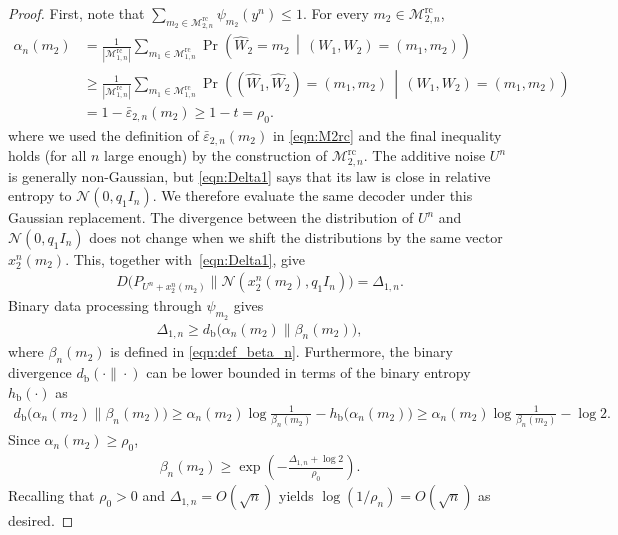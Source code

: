 \documentclass[11pt,onecolumn]{IEEEtran}
\newcommand{\calM}{\mathcal{M}}
\newcommand{\calN}{\mathcal{N}}
\newcommand{\rmb}{\mathrm{b}}
\newcommand{\bbE}{\mathbb{E}}
\newcommand{\eps}{\varepsilon}
\newcommand{\rc}{\mathrm{rc}}
\begin{document}
\begin{proof}
First, note that $\sum_{m_2 \in \calM_{2,n}^\rc}\psi_{m_2}(y^n)\le 1$.  For every $m_2\in\calM_{2,n}^\rc$, 
\begin{align}
\alpha_n(m_2)
&=\frac{1}{|\calM_{1,n}^{\rc}|}
  \sum_{m_1\in\calM_{1,n}^{\rc}}
  \Pr\!\left(
       \hat W_2=m_2
       \,\middle|\,
       (W_1,W_2)=(m_1,m_2)
       \right) \nonumber\\
&\ge
  \frac{1}{|\calM_{1,n}^{\rc}|}
  \sum_{m_1\in\calM_{1,n}^{\rc}}
  \Pr\!\left(
       (\hat W_1,\hat W_2)=(m_1,m_2)
       \,\middle|\,
       (W_1,W_2)=(m_1,m_2)
       \right) \nonumber\\
&=1-\bar{\eps}_{2,n}(m_2)
 \ge 1-t=\rho_0 .
\end{align}
where we used the definition of $\bar{\eps}_{2,n}(m_2)$ in \eqref{eqn:M2rc} and  the final inequality holds (for all $n$ large enough) by the construction of $\calM_{2,n}^\rc$. The additive noise $U^n$ is generally non-Gaussian, but \eqref{eqn:Delta1} says that its law is close in relative
entropy to $\calN(0,q_1I_n)$. We therefore evaluate the same decoder  under this Gaussian replacement. 
The divergence between the distribution of $U^n$ and $\calN(0,q_1 I_n)$ does not change when we shift the distributions by the same vector $x_2^n(m_2)$. This, together with~\eqref{eqn:Delta1}, give 
\begin{align}
D \big(P_{U^n+ x_2^n(m_2)}\| \calN(x_2^n(m_2),q_1I_n) \big)=\Delta_{1,n}.
\end{align}
Binary data processing through $\psi_{m_2}$ gives 
\begin{align}
\Delta_{1,n} \ge d_{\rmb}\big(\alpha_n(m_2) \| \beta_n(m_2) \big),
\end{align}
where $\beta_n(m_2)$  is defined in \eqref{eqn:def_beta_n}. Furthermore, the binary divergence $d_{\rmb}(\cdot\|\cdot)$ can be lower bounded in terms of the binary entropy $h_\rmb(\cdot)$ as
\begin{align}
    d_{\rmb}\big(\alpha_n(m_2) \| \beta_n(m_2) \big)\ge \alpha_n(m_2)\log\frac{1}{\beta_n(m_2) }-h_{\rmb}\big(\alpha_n(m_2)\big)\ge \alpha_n(m_2)\log\frac{1}{\beta_n(m_2) }-\log 2.
\end{align}
Since $\alpha_n(m_2)\ge\rho_0$, 
\begin{align}
\beta_n(m_2)\ge \exp\left(-\frac{\Delta_{1,n}+\log 2}{\rho_0} \right). \label{eqn:transfer}
\end{align} 
Recalling that $\rho_0>0$ and $\Delta_{1,n}=O(\sqrt{n})$ yields $\log(1/\rho_n)=O(\sqrt{n})$ as desired.
\end{proof}
\end{document}

